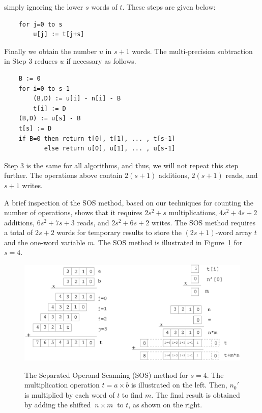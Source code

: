 \documentclass[twocolumn]{svjour3}          %
\begin{document}
simply ignoring the lower $s$ words of $t$. These steps are given below:
%
\begin{verbatim}
    for j=0 to s
        u[j] := t[j+s]
\end{verbatim}
%
Finally we obtain the number $u$ in $s+1$ words. The multi-precision
subtraction in Step 3 reduces $u$ if necessary as follows.
%
\begin{verbatim}
    B := 0
    for i=0 to s-1
        (B,D) := u[i] - n[i] - B
        t[i] := D
    (B,D) := u[s] - B
    t[s] := D
    if B=0 then return t[0], t[1], ... , t[s-1]
           else return u[0], u[1], ... , u[s-1]
\end{verbatim}
%
Step 3 is the same for all algorithms, and thus, we will not repeat
this step further. The operations above contain $2(s+1)$ additions,
$2(s+1)$ reads, and $s+1$ writes.

A brief inspection of the SOS method, based on our techniques for
counting the number of operations, shows that it requires $2s^2+s$
multiplications, $4s^2+4s+2$ additions, $6s^2+7s+3$ reads, and
$2s^2+6s+2$ writes. 
The SOS method requires a total of $2s+2$ words
for temporary results to store the $(2s+1)$-word array $t$ and the
one-word variable $m$.  The SOS method is illustrated in
Figure~\ref{sos} for $s=4$.

\begin{figure}[ht]
\caption[The Separated Operand Scanning (SOS) method for $s=4$.]
{The Separated Operand Scanning (SOS) method for $s=4$.
The multiplication operation $t=a\times b$ is illustrated on the left.
Then, $n_0'$ is multiplied by each word of $t$ to find $m$.
The final result is obtained by adding the shifted $~n\times m~$ to
$t$, as shown on the right.}
\includegraphics[width=\columnwidth]{sos.eps}
\label{sos}
\end{figure}
\end{document}
